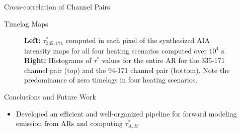 \documentclass[final]{beamer}
\begin{document}
\begin{frame}
\begin{columns}[T]
\begin{column}{0.49\linewidth}
\begin{block}{Cross-correlation of Channel Pairs}
    \end{block}
    \begin{block}{Timelag Maps}
        \begin{figure}
            \caption{\textbf{Left:} $\tau^*_{335,171}$ computed in each pixel of the synthesized AIA intensity maps for all four heating scenarios computed over $10^4$ s. \textbf{Right:} Histograms of $\tau^*$ values for the entire AR for the 335-171 channel pair (top) and the 94-171 channel pair (bottom). Note the predominance of zero timelags in four heating scenarios.}
            \label{fig:timelags}
        \end{figure}
    \end{block}
    \begin{block}{Conclusions and Future Work}
      \begin{itemize}
        \item Developed an efficient and well-organized pipeline for forward modeling emission from ARs and computing $\tau^*_{A,B}$

\end{itemize}
\end{block}
\end{column}
\end{columns}
\end{frame}
\end{document}
